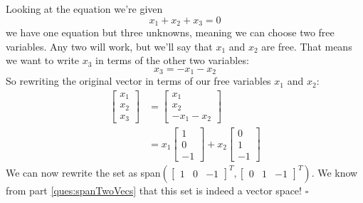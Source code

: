 \begin{enumerate}
{	Looking at the equation we're given
	$$x_1 + x_2 + x_3 = 0$$
	we have one equation but three unknowns, meaning we can choose two free variables. Any two will work, but we'll say that $x_1$ and $x_2$ are free. That means we want to write $x_3$ in terms of the other two variables:
	$$x_3 = -x_1 - x_2$$
	So rewriting the original vector in terms of our free variables $x_1$ and $x_2$:
	\begin{align*}
		\begin{bmatrix}x_1\\x_2\\x_3\end{bmatrix} &= \begin{bmatrix}x_1\\x_2\\-x_1-x_2\end{bmatrix}\\
			&= x_1\begin{bmatrix}1\\0\\-1\end{bmatrix} + x_2\begin{bmatrix}0\\1\\-1\end{bmatrix}
	\end{align*}
	We can now rewrite the set as span$\left(\begin{bmatrix}1&0&-1\end{bmatrix}^T, \begin{bmatrix}0&1&-1\end{bmatrix}^T\right)$. We know from part \ref{ques:spanTwoVecs} that this set is indeed a vector space! $\square$
}

\end{enumerate}
